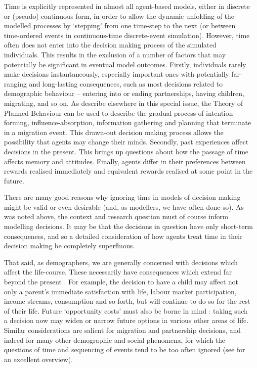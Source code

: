 \documentclass{article}
\begin{document}
Time is explicitly represented in almost all agent-based models, either in discrete or (pseudo) continuous form, in order to allow the dynamic unfolding of the modelled processes by `stepping' from one time-step to the next (or between time-ordered events in continuous-time discrete-event simulation). However, time often  does not enter into the decision making process of the simulated individuals. This results in the exclusion of a number of factors that may potentially be significant in eventual model outcomes. Firstly, individuals rarely make decisions instantaneously, especially important ones with potentially far-ranging and long-lasting consequences, such as most decisions related to demographic behaviour -- entering into or ending partnerships, having children, migrating, and so on. As \cite{Willekens2017} describe elsewhere in this special issue, the Theory of Planned Behaviour \citep{Ajzen1991} can be used to describe the gradual process of intention forming, influence-absorption, information gathering and planning that terminate in a migration event. This drawn-out decision making process allows the possibility that agents may change their minds. Secondly, past experiences affect decisions in the present. This brings up questions about how the passage of time affects memory and attitudes. Finally, agents differ in their preferences between rewards realised immediately and equivalent rewards realised at some point in the future.

There are many good reasons why ignoring time in models of decision making might be valid or even desirable (and, as modellers, we have often done so). As was noted above, the context and research question must of course inform modelling decisions. It may be that the decisions in question have only short-term consequences, and so a detailed consideration of how agents treat time in their decision making be completely superfluous.

That said, as demographers, we are generally concerned with decisions which affect the life-course. These necessarily have consequences which extend far beyond the present \citep{Willekens2001}. For example, the decision to have a child may affect not only a parent's immediate satisfaction with life, labour market participation, income streams, consumption and so forth, but will continue to do so for the rest of their life. Future `opportunity costs' must also be borne in mind \citep{Butz1979}: taking such a decision now may widen or narrow future options in various other areas of life. Similar considerations are salient for migration and partnership decisions, and indeed for many other demographic and social phenomena, for which the questions of time and sequencing of events tend to be too often ignored (see \citet{Abbott2001} for an excellent overview).
\end{document}
